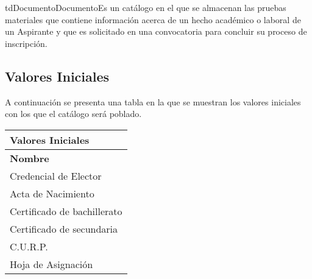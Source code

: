 \begin{TipoDeDato}{tdDocumento}{Documento}{Es un catálogo en el que se almacenan las pruebas materiales que contiene información acerca de un hecho académico o laboral de un Aspirante y que es solicitado en una convocatoria para concluir su proceso de inscripción.}


	\begin{tdAtributos}
	\end{tdAtributos}
	
	\subsection{Valores Iniciales}
	A continuación se presenta una tabla en la que se muestran los valores iniciales con los que el catálogo será poblado. \cdtEmpty
		\begin{longtable}{|p{}|}
				\hline
				\rowcolor{colorPrincipal}
	 			\bf \color{white} Valores Iniciales\\
	 			\hline
	 			\rowcolor{colorSecundario}
	 			\bf\color{white}Nombre\\
	 			\hline
	 			Credencial de Elector \\
	 			\hline
	 			Acta de Nacimiento\\
	 			\hline
				Certificado de bachillerato\\
				\hline
				Certificado de secundaria\\
				\hline
				C.U.R.P.\\
				\hline
				Hoja de Asignación\\
	 			\hline
		\end{longtable}
\end{TipoDeDato}

